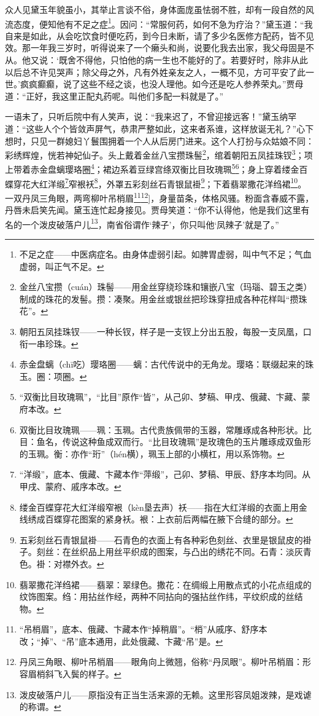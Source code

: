 \par 众人见黛玉年貌虽小，其举止言谈不俗，身体面庞虽怯弱不胜，却有一段自然的风流态度，便知他有不足之症\footnote{不足之症——中医病症名。由身体虚弱引起。如脾胃虚弱，叫中气不足；气血虚弱，叫正气不足。}。因问：“常服何药，如何不急为疗治？”黛玉道：“我自来是如此，从会吃饮食时便吃药，到今日未断，请了多少名医修方配药，皆不见效。那一年我三岁时，听得说来了一个癞头和尚，说要化我去出家，我父母固是不从。他又说：‘既舍不得他，只怕他的病一生也不能好的了。若要好时，除非从此以后总不许见哭声；除父母之外，凡有外姓亲友之人，一概不见，方可平安了此一世。’疯疯癫癫，说了这些不经之谈，也没人理他。如今还是吃人参养荣丸。”贾母道：“正好，我这里正配丸药呢。叫他们多配一料就是了。”
\par 一语未了，只听后院中有人笑声，说：“我来迟了，不曾迎接远客！”黛玉纳罕道：“这些人个个皆敛声屏气，恭肃严整如此，这来者系谁，这样放诞无礼？”心下想时，只见一群媳妇丫鬟围拥着一个人从后房门进来。这个人打扮与众姑娘不同：彩绣辉煌，恍若神妃仙子。头上戴着金丝八宝攒珠髻\footnote{金丝八宝攒（cuán）珠髻——用金丝穿绕珍珠和镶嵌八宝（玛瑙、碧玉之类）制成的珠花的发髻。攒：凑聚。用金丝或银丝把珍珠穿扭成各种花样叫“攒珠花”。}，绾着朝阳五凤挂珠钗\footnote{朝阳五凤挂珠钗——一种长钗，样子是一支钗上分出五股，每股一支凤凰，口衔一串珍珠。}；项上带着赤金盘螭璎珞圈\footnote{赤金盘螭（chī吃）璎珞圈——螭：古代传说中的无角龙。璎珞：联缀起来的珠玉。圈：项圈。}；裙边系着豆绿宫绦双衡比目玫瑰珮\footnote{“双衡比目玫瑰珮”，“比目”原作“皆”，从己卯、梦稿、甲戌、俄藏、卞藏、蒙府本改。}\footnote{双衡比目玫瑰珮——珮：玉珮。古代贵族佩带的玉器，常雕琢成各种形状。比目：鱼名，传说这种鱼成双而行。“比目玫瑰珮”是玫瑰色的玉片雕琢成双鱼形的玉珮。衡：亦作“珩”（hén横），珮玉上部的小横杠，用以系饰物。}；身上穿着缕金百蝶穿花大红洋缎\footnote{“洋缎”，底本、俄藏、卞藏本作“萍缎”，己卯、梦稿、甲辰、舒序本均同。从甲戌、蒙府、戚序本改。}窄裉袄\footnote{缕金百蝶穿花大红洋缎窄裉（kèn垦去声）袄——指在大红洋缎的衣面上用金线绣成百蝶穿花图案的紧身袄。裉：上衣前后两幅在腋下合缝的部分。}，外罩五彩刻丝石青银鼠褂\footnote{五彩刻丝石青银鼠褂——石青色的衣面上有各种彩色刻丝、衣里是银鼠皮的褂子。刻丝：在丝织品上用丝平织成的图案，与凸出的绣花不同。石青：淡灰青色。褂：对襟外衣。}；下着翡翠撒花洋绉裙\footnote{翡翠撒花洋绉裙——翡翠：翠绿色。撒花：在绸缎上用散点式的小花点组成的纹饰图案。绉：用拈丝作经，两种不同拈向的强拈丝作纬，平纹织成的丝结物。}。一双丹凤三角眼，两弯柳叶吊梢眉\footnote{“吊梢眉”，底本、俄藏、卞藏本作“掉稍眉”。“梢”从戚序、舒序本改；“掉”、“吊”底本通用，此处俄藏、卞藏“吊”是。}\footnote{丹凤三角眼、柳叶吊梢眉——眼角向上微翘，俗称“丹凤眼”。柳叶吊梢眉：形容眉梢斜飞入鬓的样子。}]，身量苗条，体格风骚。粉面含春威不露，丹唇未启笑先闻。黛玉连忙起身接见。贾母笑道：“你不认得他，他是我们这里有名的一个泼皮破落户儿\footnote{泼皮破落户儿——原指没有正当生活来源的无赖。这里形容凤姐泼辣，是戏谑的称谓。}，南省俗谓作‘辣子’，你只叫他‘凤辣子’就是了。”
